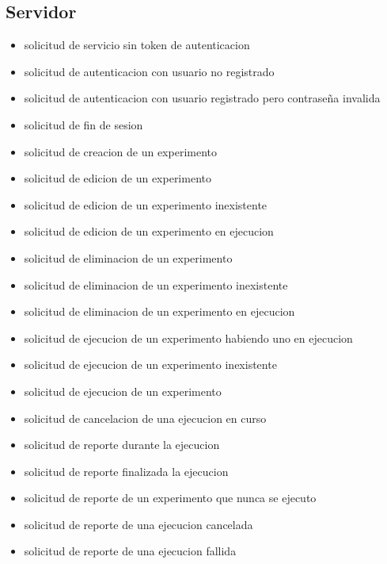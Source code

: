 \subsection{Servidor}
\begin{itemize}
\item solicitud de servicio sin token de autenticacion
\item solicitud de autenticacion con usuario no registrado
\item solicitud de autenticacion con usuario registrado pero contraseña invalida
\item solicitud de fin de sesion
\item solicitud de creacion de un experimento
\item solicitud de edicion de un experimento
\item solicitud de edicion de un experimento inexistente
\item solicitud de edicion de un experimento en ejecucion
\item solicitud de eliminacion de un experimento
\item solicitud de eliminacion de un experimento inexistente
\item solicitud de eliminacion de un experimento en ejecucion
\item solicitud de ejecucion de un experimento habiendo uno en ejecucion
\item solicitud de ejecucion de un experimento inexistente
\item solicitud de ejecucion de un experimento
\item solicitud de cancelacion de una ejecucion en curso
\item solicitud de reporte durante la ejecucion
\item solicitud de reporte finalizada la ejecucion
\item solicitud de reporte de un experimento que nunca se ejecuto
\item solicitud de reporte de una ejecucion cancelada
\item solicitud de reporte de una ejecucion fallida
\end{itemize}

